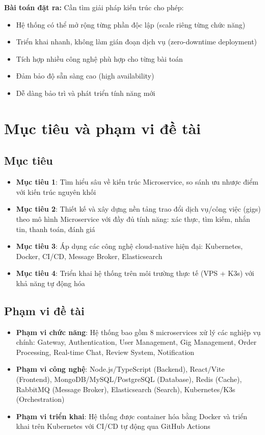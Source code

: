 \documentclass[12pt]{extreport}
\begin{document}
\textbf{Bài toán đặt ra:} Cần tìm giải pháp kiến trúc cho phép:
\begin{itemize}
    \item Hệ thống có thể mở rộng từng phần độc lập (scale riêng từng chức năng)
    \item Triển khai nhanh, không làm gián đoạn dịch vụ (zero-downtime deployment)
    \item Tích hợp nhiều công nghệ phù hợp cho từng bài toán
    \item Đảm bảo độ sẵn sàng cao (high availability)
    \item Dễ dàng bảo trì và phát triển tính năng mới
\end{itemize}

\section{Mục tiêu và phạm vi đề tài}

\subsection{Mục tiêu}

\begin{itemize}
    \item \textbf{Mục tiêu 1}: Tìm hiểu sâu về kiến trúc Microservice, so sánh ưu nhược điểm với kiến trúc nguyên khối
    \item \textbf{Mục tiêu 2}: Thiết kế và xây dựng nền tảng trao đổi dịch vụ/công việc (gigs) theo mô hình Microservice với đầy đủ tính năng: xác thực, tìm kiếm, nhắn tin, thanh toán, đánh giá
    \item \textbf{Mục tiêu 3}: Áp dụng các công nghệ cloud-native hiện đại: Kubernetes, Docker, CI/CD, Message Broker, Elasticsearch
    \item \textbf{Mục tiêu 4}: Triển khai hệ thống trên môi trường thực tế (VPS + K3s) với khả năng tự động hóa
\end{itemize}

\subsection{Phạm vi đề tài}

\begin{itemize}
    \item \textbf{Phạm vi chức năng}: Hệ thống bao gồm 8 microservices xử lý các nghiệp vụ chính: Gateway, Authentication, User Management, Gig Management, Order Processing, Real-time Chat, Review System, Notification
    \item \textbf{Phạm vi công nghệ}: Node.js/TypeScript (Backend), React/Vite (Frontend), MongoDB/MySQL/PostgreSQL (Database), Redis (Cache), RabbitMQ (Message Broker), Elasticsearch (Search), Kubernetes/K3s (Orchestration)
    \item \textbf{Phạm vi triển khai}: Hệ thống được container hóa bằng Docker và triển khai trên Kubernetes với CI/CD tự động qua GitHub Actions
\end{itemize}
\end{document}
